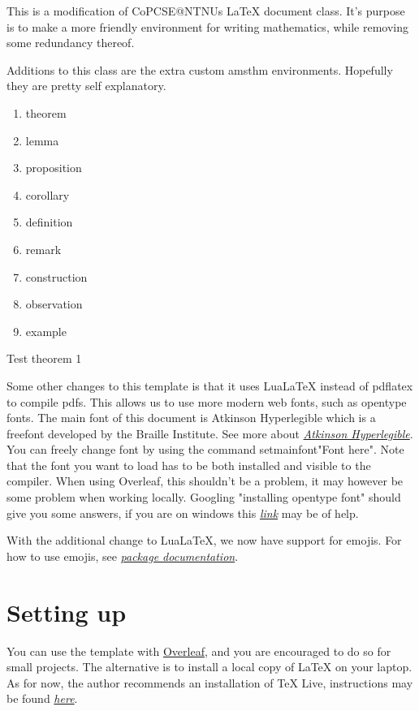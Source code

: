 \documentclass[../thesis.tex]{subfiles}
\begin{document}
This is a modification of CoPCSE@NTNUs LaTeX document class. It's purpose is to make a more friendly environment for writing mathematics, while removing some redundancy thereof.

Additions to this class are the extra custom amsthm environments. Hopefully they are pretty self explanatory.

\begin{enumerate}
    \item theorem
    \item lemma
    \item proposition
    \item corollary
    \item definition
    \item remark
    \item construction
    \item observation
    \item example
\end{enumerate}

\begin{theorem}
    Test theorem 1
\end{theorem}

Some other changes to this template is that it uses LuaLaTeX instead of pdflatex to compile pdfs. This allows us to use more modern web fonts, such as opentype fonts. The main font of this document is Atkinson Hyperlegible which is a freefont developed by the Braille Institute. See more about \href{https://brailleinstitute.org/freefont}{\textit{Atkinson Hyperlegible}}. You can freely change font by using the command setmainfont{"Font here"}. Note that the font you want to load has to be both installed and visible to the compiler. When using Overleaf, this shouldn't be a problem, it may however be some problem when working locally. Googling "installing opentype font" should give you some answers, if you are on windows this \href{https://www.lifewire.com/installing-truetype-or-opentype-fonts-in-windows-1074134}{\textit{link}} may be of help.

With the additional change to LuaLaTeX, we now have support for emojis. For how to use emojis, see \href{https://texdoc.org/serve/emoji/0}{\textit{package documentation}}.

\section{Setting up}

You can use the template with \href{http://overleaf.com}{Overleaf}, and you are encouraged to do so for small projects. The alternative is to install a local copy of LaTeX on your laptop. As for now, the author recommends an installation of TeX Live, instructions may be found \href{https://www.tug.org/texlive/quickinstall.html}{\textit{here}}.
\end{document}
